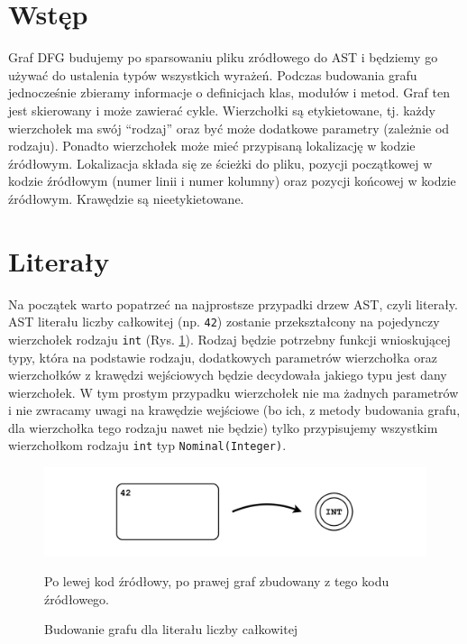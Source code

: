 \documentclass[shortabstract,mgr]{iithesis}
\begin{document}
\section{Wstęp}


Graf DFG budujemy po sparsowaniu pliku zródłowego do AST i będziemy go używać do ustalenia typów wszystkich wyrażeń.
Podczas budowania grafu jednocześnie zbieramy informacje o definicjach klas, modułów i metod.
Graf ten jest skierowany i może zawierać cykle. Wierzchołki są etykietowane, tj. każdy wierzchołek ma swój ``rodzaj'' oraz być może dodatkowe parametry (zależnie od rodzaju). Ponadto wierzchołek może mieć przypisaną lokalizację w kodzie źródłowym. Lokalizacja składa się ze ścieżki do pliku, pozycji początkowej w kodzie źródłowym (numer linii i numer kolumny) oraz pozycji końcowej w kodzie źródłowym. Krawędzie są nieetykietowane.

\section{Literały}

Na początek warto popatrzeć na najprostsze przypadki drzew AST, czyli literały. AST literału liczby całkowitej (np. \texttt{42}) zostanie przekształcony na pojedynczy wierzchołek rodzaju \texttt{int} (Rys. \ref{fig:graph-int}). Rodzaj będzie potrzebny funkcji wnioskującej typy, która na podstawie rodzaju, dodatkowych parametrów wierzchołka oraz wierzchołków z krawędzi wejściowych będzie decydowała jakiego typu jest dany wierzchołek. W tym prostym przypadku wierzchołek nie ma żadnych parametrów i nie zwracamy uwagi na krawędzie wejściowe (bo ich, z metody budowania grafu, dla wierzchołka tego rodzaju nawet nie będzie) tylko przypisujemy wszystkim wierzchołkom rodzaju \texttt{int} typ \texttt{Nominal(Integer)}.

\begin{figure}[htb]
	\centering
	\includegraphics[scale=0.4]{imgs/msc-int.png}
	\caption{Budowanie grafu dla literału liczby całkowitej}
        Po lewej kod źródłowy, po prawej graf zbudowany z tego kodu źródłowego.
	\label{fig:graph-int}
\end{figure}
\end{document}
